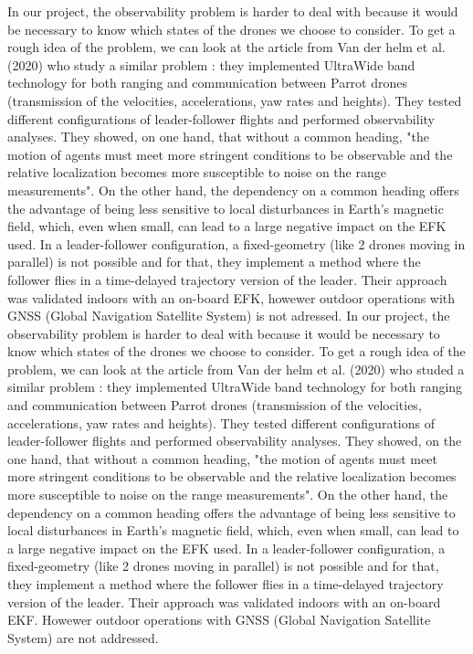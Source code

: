 In our project, the observability problem is harder to deal with because it would be necessary to know which states of the drones we choose to consider. To get a rough idea of the problem, we can look at the article from Van der helm et al. (2020) \parencite{van_der_helm_-board_2020} who study a similar problem : they implemented UltraWide band technology for both ranging and communication between Parrot drones (transmission of the velocities, accelerations, yaw rates and heights). They tested different configurations of leader-follower flights and performed observability analyses. They showed, on one hand, that without a common heading, "the motion of agents must meet more stringent conditions to be observable and the relative localization becomes more susceptible to noise on the range measurements". On the other hand, the dependency on a common heading offers the advantage of being less sensitive to local disturbances in Earth's magnetic field, which, even when small, can lead to a large negative impact on the EFK used. In a leader-follower configuration, a fixed-geometry (like 2 drones moving in parallel) is not possible and for that, they implement a method where the follower flies in a time-delayed trajectory version of the leader. Their approach was validated indoors with an on-board EFK, howewer outdoor operations with GNSS (Global Navigation Satellite System) is not adressed.
In our project, the observability problem is harder to deal with because it would be necessary to know which states of the drones we choose to consider. To get a rough idea of the problem, we can look at the article from Van der helm et al. (2020) \parencite{van_der_helm_-board_2020} who studed a similar problem : they implemented UltraWide band technology for both ranging and communication between Parrot drones (transmission of the velocities, accelerations, yaw rates and heights). They tested different configurations of leader-follower flights and performed observability analyses. They showed, on the one hand, that without a common heading, "the motion of agents must meet more stringent conditions to be observable and the relative localization becomes more susceptible to noise on the range measurements". On the other hand, the dependency on a common heading offers the advantage of being less sensitive to local disturbances in Earth's magnetic field, which, even when small, can lead to a large negative impact on the EFK used. In a leader-follower configuration, a fixed-geometry (like 2 drones moving in parallel) is not possible and for that, they implement a method where the follower flies in a time-delayed trajectory version of the leader. Their approach was validated indoors with an on-board EKF. Howewer outdoor operations with GNSS (Global Navigation Satellite System) are not addressed.

